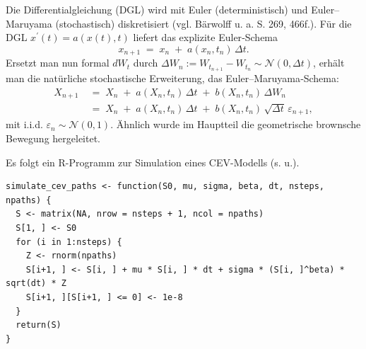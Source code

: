 Die Differentialgleichung (DGL) wird mit Euler (deterministisch) und Euler–Maruyama (stochastisch) diskretisiert (vgl. Bärwolff \cite{Baerwolff2025} u. a. S. 269, 466f.).
Für die DGL $x^\prime(t)=a(x(t),t)$ liefert das explizite Euler‑Schema
$$
x_{n+1} \;=\; x_n \;+\; a(x_n,t_n)\,\Delta t.
$$
Ersetzt man nun formal $dW_t$ durch $\Delta W_n:=W_{t_{n+1}}-W_{t_n}\sim \mathcal N(0,\Delta t)$, erhält man die natürliche stochastische Erweiterung, das Euler–Maruyama‑Schema:
$$
\begin{aligned}
X_{n+1} \;&=\; X_n \;+\; a(X_n,t_n)\,\Delta t \;+\; b(X_n,t_n)\,\Delta W_n \\
\;&=\; X_n \;+\; a(X_n,t_n)\,\Delta t \;+\; b(X_n,t_n)\,\sqrt{\Delta t}\,\varepsilon_{n+1},
\end{aligned}
$$
mit i.i.d. $\varepsilon_{n}\sim\mathcal N(0,1)$. 
Ähnlich wurde im Hauptteil die geometrische brownsche Bewegung hergeleitet.

\begin{bsp}[Implementierung]
Es folgt ein R-Programm zur Simulation eines CEV-Modells (s. u.).

\begin{lstlisting}
simulate_cev_paths <- function(S0, mu, sigma, beta, dt, nsteps, npaths) {
  S <- matrix(NA, nrow = nsteps + 1, ncol = npaths)
  S[1, ] <- S0
  for (i in 1:nsteps) {
    Z <- rnorm(npaths)
    S[i+1, ] <- S[i, ] + mu * S[i, ] * dt + sigma * (S[i, ]^beta) * sqrt(dt) * Z
    S[i+1, ][S[i+1, ] <= 0] <- 1e-8
  }
  return(S)
}
\end{lstlisting}

\end{bsp}

